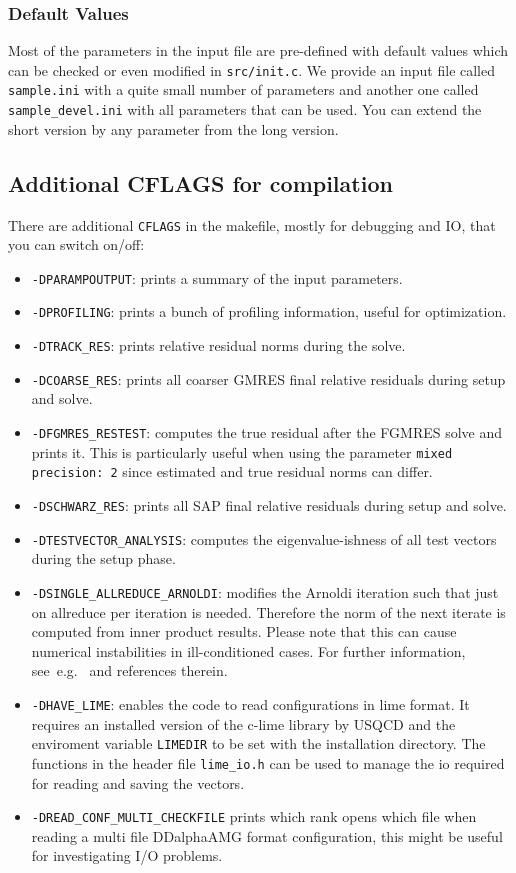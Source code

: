 \documentclass[a4paper,12pt]{scrartcl}
\begin{document}
\subsubsection{Default Values}
Most of the parameters in the input file are pre-defined with default values which can be checked or even modified in \texttt{src/init.c}. We provide an input file called \texttt{sample.ini} with a quite small number of parameters and another one called \texttt{sample\_devel.ini} with all parameters that can be used. You can extend the short version by any parameter from the long version.

\subsection{Additional CFLAGS for compilation} \label{additionalcflags}
There are additional \texttt{CFLAGS} in the makefile, mostly for debugging and IO, that you can switch on/off:
\begin{itemize}
  \item \texttt{-DPARAMPOUTPUT}: prints a summary of the input parameters.
  \item \texttt{-DPROFILING}: prints a bunch of profiling information, useful for optimization.
  \item \texttt{-DTRACK\_RES}: prints relative residual norms during the solve. 
  \item \texttt{-DCOARSE\_RES}: prints all coarser GMRES final relative residuals during setup and solve.
  \item \texttt{-DFGMRES\_RESTEST}: computes the true residual after the FGMRES solve and prints it. This is particularly useful when using the parameter \texttt{mixed precision: 2} since estimated and true residual norms can differ.
  \item \texttt{-DSCHWARZ\_RES}: prints all SAP final relative residuals during setup and solve.
  \item \texttt{-DTESTVECTOR\_ANALYSIS}: computes the eigenvalue-ishness of all test vectors during the setup phase.
  \item \texttt{-DSINGLE\_ALLREDUCE\_ARNOLDI}: modifies the Arnoldi iteration such that just on allreduce per iteration is needed. Therefore the norm of the next iterate is computed from inner product results. Please note that this can cause numerical instabilities in ill-conditioned cases. For further information, see~e.g.~\cite{RottmannPhD} and references therein.
  \item \texttt{-DHAVE\_LIME}: enables the code to read configurations in lime format. It requires an installed version of the c-lime library by USQCD and the enviroment variable \texttt{LIMEDIR} to be set with the installation directory. The functions in the header file \texttt{lime\_io.h} can be used to manage the io required for reading and saving the vectors.
  \item \texttt{-DREAD\_CONF\_MULTI\_CHECKFILE} prints which rank opens which file when reading a multi file DDalphaAMG format configuration, this might be useful for investigating I/O problems.
\end{itemize}
\end{document}

